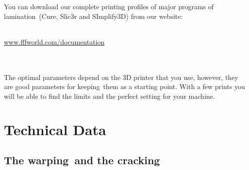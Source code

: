 \documentclass[11pt,a4paper]{article}
\begin{document}
You can download our complete printing profiles of major programs of lamination (Cure, Slic3r and SImplify3D) from our website:
\\\\
\centerline{ {\huge \url{www.fffworld.com/documentation} } }
\\\\
The optimal parameters depend on the 3D printer that you use, however, they are good parameters for keeping them as a starting point. With a few prints you will be able to find the limits and the perfect setting for your machine.
\section{Technical Data}
	\subsection{The warping and the cracking}
\end{document}

